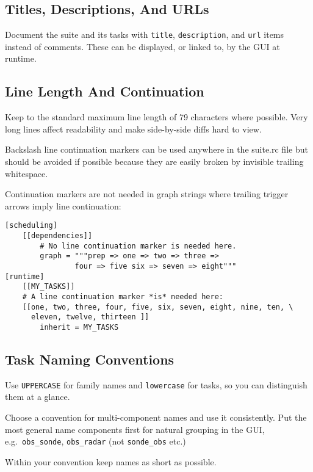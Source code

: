 \subsection{Titles, Descriptions, And URLs}

Document the suite and its tasks with \lstinline=title=,
\lstinline=description=, and \lstinline=url= items instead of comments. These
can be displayed, or linked to, by the GUI at runtime.

\subsection{Line Length And Continuation}
\label{Line Length}

Keep to the standard maximum line length of 79 characters where possible. Very
long lines affect readability and make side-by-side diffs hard to view.

Backslash line continuation markers can be used anywhere in the suite.rc file
but should be avoided if possible because they are easily broken by invisible
trailing whitespace.

Continuation markers are not needed in graph strings where trailing
trigger arrows imply line continuation:

\lstset{language=suiterc}
\begin{lstlisting}
[scheduling]
    [[dependencies]]
        # No line continuation marker is needed here.
        graph = """prep => one => two => three =>
                four => five six => seven => eight"""
[runtime]
    [[MY_TASKS]]
    # A line continuation marker *is* needed here:
    [[one, two, three, four, five, six, seven, eight, nine, ten, \
      eleven, twelve, thirteen ]]
        inherit = MY_TASKS
\end{lstlisting}

\subsection{Task Naming Conventions}

Use \lstinline=UPPERCASE= for family names and \lstinline=lowercase=
for tasks, so you can distinguish them at a glance.

Choose a convention for multi-component names and use it consistently. Put the
most general name components first for natural grouping in the GUI, e.g.\
\lstinline=obs_sonde=, \lstinline=obs_radar= (not \lstinline=sonde_obs= etc.)

Within your convention keep names as short as possible.

